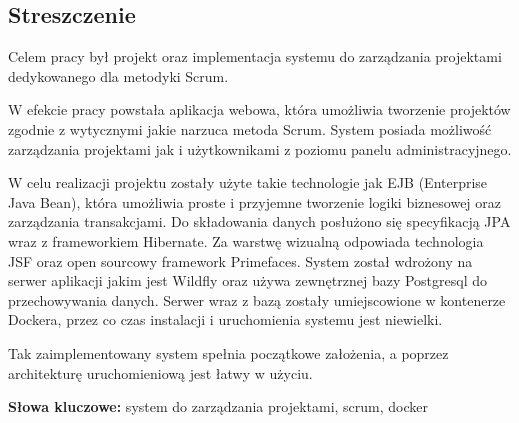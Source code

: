 \subsection*{Streszczenie}

Celem pracy był projekt oraz implementacja systemu do zarządzania projektami dedykowanego dla metodyki Scrum.

W efekcie pracy powstała aplikacja webowa, która umożliwia tworzenie projektów zgodnie z wytycznymi jakie narzuca metoda Scrum. System posiada możliwość zarządzania projektami jak i użytkownikami z poziomu panelu administracyjnego.

W celu realizacji projektu zostały użyte takie technologie jak EJB (Enterprise Java Bean), która umożliwia proste i przyjemne tworzenie logiki biznesowej oraz zarządzania transakcjami. Do składowania danych posłużono się specyfikacją JPA wraz z frameworkiem Hibernate. Za warstwę wizualną odpowiada technologia JSF oraz open sourcowy framework Primefaces. System został wdrożony na serwer aplikacji jakim jest Wildfly oraz używa zewnętrznej bazy Postgresql do przechowywania danych. Serwer wraz z bazą zostały umiejscowione w kontenerze Dockera, przez co czas instalacji i uruchomienia systemu jest niewielki.

Tak zaimplementowany system spełnia początkowe założenia, a poprzez architekturę uruchomieniową jest łatwy w użyciu.


\vspace{1cm}
\noindent\textbf{Słowa kluczowe:} system do zarządzania projektami, scrum, docker